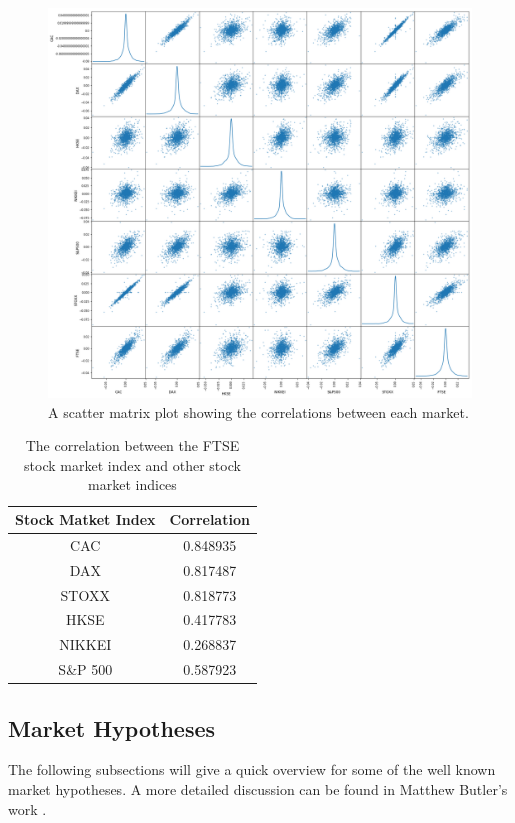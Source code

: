\documentclass{UoYCSproject}
\begin{document}
\begin{figure}[h]
\includegraphics[width=12cm]{market_correlation}
\centering
\caption{A scatter matrix plot showing the correlations between each market.} 
\label{fig:scatterplot}
\end{figure}

\begin{table}[h]
    \centering
    \begin{tabular}{|c|c|} \hline
        \textbf{Stock Matket Index} & \textbf{Correlation} \\ \hline
        CAC &       0.848935 \\
        DAX  &     0.817487\\
        STOXX &    0.818773\\
        HKSE   &   0.417783\\
        NIKKEI  &  0.268837\\
        S\&P 500   & 0.587923\\

        \hline
    \end{tabular}
    \caption{The correlation between the FTSE stock market index and other stock market indices}
    \label{tab:indices}
\end{table}


\subsection{Market Hypotheses}
The following subsections will give a quick overview for some of the well known market hypotheses. A more detailed discussion can be found in Matthew Butler's work \cite{butler2012computational}.
\end{document}
